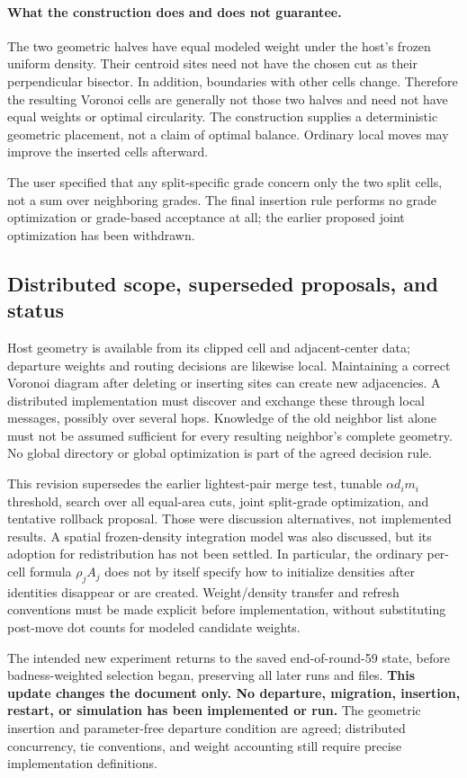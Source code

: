 \documentclass[11pt]{article}
\begin{document}
\paragraph{What the construction does and does not guarantee.}
The two geometric halves have equal modeled weight under the host's frozen
uniform density. Their centroid sites need not have the chosen cut as their
perpendicular bisector. In addition, boundaries with other cells change.
Therefore the resulting Voronoi cells are generally not those two halves and
need not have equal weights or optimal circularity. The construction supplies
a deterministic geometric placement, not a claim of optimal balance.
Ordinary local moves may improve the inserted cells afterward.

The user specified that any split-specific grade concern only the two split
cells, not a sum over neighboring grades. The final insertion rule performs
no grade optimization or grade-based acceptance at all; the earlier proposed
joint optimization has been withdrawn.

\subsection{Distributed scope, superseded proposals, and status}
Host geometry is available from its clipped cell and adjacent-center data;
departure weights and routing decisions are likewise local. Maintaining a
correct Voronoi diagram after deleting or inserting sites can create new
adjacencies. A distributed implementation must discover and exchange these
through local messages, possibly over several hops. Knowledge of the old
neighbor list alone must not be assumed sufficient for every resulting
neighbor's complete geometry. No global directory or global optimization is
part of the agreed decision rule.

This revision supersedes the earlier lightest-pair merge test, tunable
$\alpha d_i m_i$ threshold, search over all equal-area cuts, joint split-grade
optimization, and tentative rollback proposal. Those were discussion
alternatives, not implemented results. A spatial frozen-density integration
model was also discussed, but its adoption for redistribution has not been
settled. In particular, the ordinary per-cell formula $\rho_j A_j$ does not
by itself specify how to initialize densities after identities disappear or
are created. Weight/density transfer and refresh conventions must be made
explicit before implementation, without substituting post-move dot counts
for modeled candidate weights.

The intended new experiment returns to the saved end-of-round-59 state,
before badness-weighted selection began, preserving all later runs and files.
\textbf{This update changes the document only. No departure, migration,
insertion, restart, or simulation has been implemented or run.}
The geometric insertion and parameter-free departure condition are agreed;
distributed concurrency, tie conventions, and weight accounting still require
precise implementation definitions.
\end{document}
